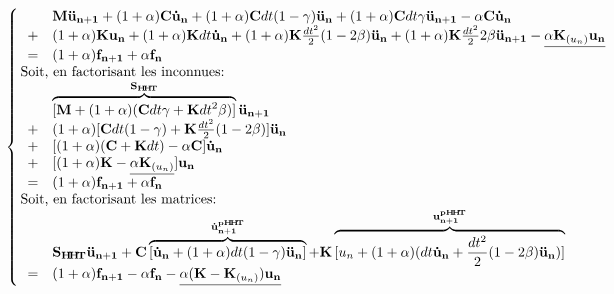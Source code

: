 \documentclass[12pt,a4paper]{report}
\begin{document}
\begin{equation}
	\!\!\!\!\!\!\!
	\left\{
	\!\!\!\!\!\!\!\!
	\begin{array}{l l l}
		\begin{array}{r c l}
			& &\mathbf{M}{\mathbf{\ddot{u}_{n+1}}} 
			+ (1+\alpha)\mathbf{C} {\mathbf{\dot{u}_n}}
			+ (1+\alpha)\mathbf{C} dt (1-\gamma){\mathbf{\ddot{u}_n}}
			+ (1+\alpha)\mathbf{C} dt \gamma {\mathbf{\ddot{u}_{n+1}}} 
			- \alpha \mathbf{C} \mathbf{\dot{u}_n}
			\\
			&+& (1+\alpha)\mathbf{K} \mathbf{u_n}
			+ (1+\alpha)\mathbf{K} dt \mathbf{\dot{u}_n}
			+ (1+\alpha)\mathbf{K} \frac{dt^2}{2} (1-2 \beta){\mathbf{\ddot{u}_n}}
			+ (1+\alpha)\mathbf{K} \frac{dt^2}{2} 2 \beta {\mathbf{\ddot{u}_{n+1}}}
			- \underline{\alpha \mathbf{K}_{(u_{n})} \mathbf{u_n} }
			\\
			&=& (1+\alpha)\mathbf{f_{n+1}}  + \alpha \mathbf{f_n}
		\end{array}
		\\
		~~~$Soit, en factorisant les inconnues:$
		\\
		\begin{array}{r c l}
			   & &\overbrace{
			   			[\mathbf{M} + (1+ \alpha)(\mathbf{C} dt \gamma 
			   								+ \mathbf{K} dt^2 \beta)] }^{\mathbf{S_{H\!H\!T}} }
			   		\mathbf{\ddot{u}_{n+1}}
			\\ &+&(1+ \alpha)[\mathbf{C} dt (1- \gamma) + \mathbf{K} \frac{dt^2}{2} (1-2\beta)] 					\mathbf{\ddot{u}_n}
			\\ &+&[(1+ \alpha) (\mathbf{C} + \mathbf{K} dt)-\alpha \mathbf{C}] \mathbf{\dot{u}_n}
			\\ &+&[(1+ \alpha) \mathbf{K} 
				-\underline{\alpha \mathbf{K}_{(u_{n})}}] \mathbf{u_n}
			
			\\ &=& (1+\alpha)\mathbf{f_{n+1}}  + \alpha \mathbf{f_n} 
		\end{array}
		\\
		~~~$Soit, en factorisant les matrices:$
		\\
		\begin{array}{r c l}
			   & & \mathbf{S_{H\!H\!T}} \mathbf{\ddot{u}_{n+1}} 
			+\mathbf{C}\overbrace	{
						[\mathbf{\dot{u}_n} + (1+\alpha) dt (1-\gamma) \mathbf{\ddot{u}_n}]
					}
					^{\mathbf{\dot{u}_{n+1}^{pH\!H\!T} }}			
			+\mathbf{K}\overbrace	{
						[u_n + (1+ \alpha)( dt \mathbf{\dot{u}_n} 
						 + \frac{dt^2}{2} (1-2\beta) \mathbf{\ddot{u}_n})]
					}
					^{\mathbf{u_{n+1}^{pH\!H\!T}} }
			\\ &=& (1+\alpha)\mathbf{f_{n+1}}  - \alpha \mathbf{f_n}
			    - \underline{ \alpha (\mathbf{K}-\mathbf{K}_{(u_{n})} ) \mathbf{u_n}}
		\end{array}
	\end{array}
	\right.
	\!\!\!\!\!\!\!\!\!\!\!\!\!\!\!\!\!\!\!\!\!
	\!\!\!\!\!\!\!\!\!\!\!\!\!\!\!\!\!\!\!\!\!
\end{equation}
\end{document}
